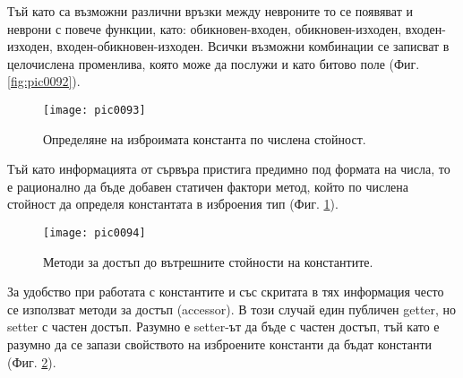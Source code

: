 Тъй като са възможни различни връзки между невроните то се появяват и неврони с повече функции, като: обикновен-входен, обикновен-изходен, входен-изходен, входен-обикновен-изходен. Всички възможни комбинации се записват в целочислена променлива, която може да послужи и като битово поле (Фиг. \ref{fig:pic0092}).

\begin{figure}[h]
  \centering
  \texttt{[image: pic0093]}
  \caption{Определяне на изброимата константа по числена стойност.}
\label{fig:pic0093}
\end{figure}
\FloatBarrier

Тъй като информацията от сървъра пристига предимно под формата на числа, то е рационално да бъде добавен статичен фактори метод, който по числена стойност да определя константата в изброения тип (Фиг. \ref{fig:pic0093}).

\begin{figure}[h]
  \centering
  \texttt{[image: pic0094]}
  \caption{Методи за достъп до вътрешните стойности на константите.}
\label{fig:pic0094}
\end{figure}
\FloatBarrier

За удобство при работата с константите и със скритата в тях информация често се използват методи за достъп (accessor). В този случай един публичен getter, но setter с частен достъп. Разумно е setter-ът да бъде с частен достъп, тъй като е разумно да се запази свойството на изброените константи да бъдат константи (Фиг. \ref{fig:pic0094}).